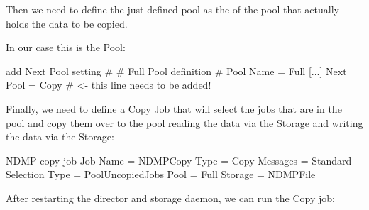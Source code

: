 Then we need to define the just defined pool as the  of the pool 
that actually holds the data to be copied.

In our case this is the  Pool:
\begin{bconfig}{add Next Pool setting}
#
# Full Pool definition
#
Pool {
  Name = Full
  [...]
  Next Pool = Copy   # <- this line needs to be added!
}
\end{bconfig}


Finally, we need to define a Copy Job that will select the jobs that are in the  pool
and copy them over to the  pool 
reading the data via the  Storage
and writing the data via the  Storage:

\begin{bconfig}{NDMP copy job}
Job {
   Name = NDMPCopy
   Type = Copy
   Messages = Standard
   Selection Type = PoolUncopiedJobs
   Pool = Full
   Storage = NDMPFile
}
\end{bconfig}

After restarting the director and storage daemon, we can run the Copy job:

